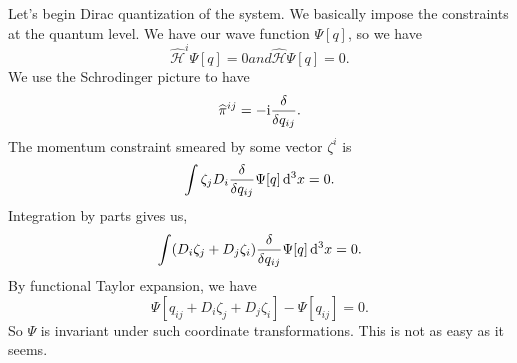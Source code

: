 Let's begin Dirac quantization of the system. We basically impose the
constraints at the quantum level. We have our wave function $\Psi[q]$,
so we have
\begin{subequations}
\begin{equation}
\widehat{\mathcal{H}}^{i}\Psi[q]=0
\end{equation}
and
\begin{equation}
\widehat{\mathcal{H}}\Psi[q]=0.
\end{equation}
\end{subequations}
We use the Schrodinger picture to have
\begin{equation}
\widehat{\pi}^{ij} = -\mathrm{i}\frac{\delta}{\delta q_{ij}}.
\end{equation}
The momentum constraint smeared by some vector $\zeta^{i}$ is
\begin{equation}
\int\zeta_{j}D_{i}\frac{\delta}{\delta q_{ij}}\Psi[q]\,\mathrm{d}^{3}x=0.
\end{equation}
Integration by parts gives us,
\begin{equation}
\int(D_{i}\zeta_{j}+D_{j}\zeta_{i})\frac{\delta}{\delta q_{ij}}\Psi[q]\,\mathrm{d}^{3}x=0.
\end{equation}
By functional Taylor expansion, we have
\begin{equation}
\Psi[q_{ij} + D_{i}\zeta_{j}+D_{j}\zeta_{i}] - \Psi[q_{ij}]=0.
\end{equation}
So $\Psi$ is invariant under such coordinate transformations. This is
not as easy as it seems.
